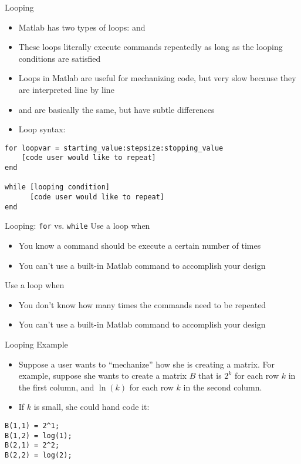 \documentclass[english,xcolor=dvipsnames]{beamer}
\begin{document}
\begin{frame}[fragile]{Looping}
\begin{itemize}
	\item Matlab has two types of loops:  and  
	\item These loops literally execute commands repeatedly as long as the looping conditions are satisfied
	\item Loops in Matlab are useful for mechanizing code, but very slow because they are interpreted line by line
	\item {} and  are basically the same, but have subtle differences
	\item Loop syntax:
\end{itemize}
\begin{lstlisting}
for loopvar = starting_value:stepsize:stopping_value
    [code user would like to repeat]
end

while [looping condition]
      [code user would like to repeat]
end
\end{lstlisting}
\end{frame}

\begin{frame}[fragile]{Looping: \texttt{for} vs. \texttt{while}}
Use a  loop when
\begin{itemize}
	\item You know a command should be execute a certain number of times
	\item You can't use a built-in Matlab command to accomplish your design
\end{itemize}
\vfill
Use a  loop when
\begin{itemize}
	\item You don't know how many times the commands need to be repeated
	\item You can't use a built-in Matlab command to accomplish your design
\end{itemize}
\end{frame}

\begin{frame}[fragile]{Looping Example}
\begin{itemize}
	\item Suppose a user wants to ``mechanize'' how she is creating a matrix. For example, suppose she wants to create a matrix $B$ that is $2^k$ for each row $k$ in the first column, and $\ln(k)$ for each row $k$ in the second column. 
	\item If $k$ is small, she could hand code it:
\end{itemize}
\begin{lstlisting}
B(1,1) = 2^1;
B(1,2) = log(1);
B(2,1) = 2^2;
B(2,2) = log(2);
\end{lstlisting}
\end{frame}
\end{document}
